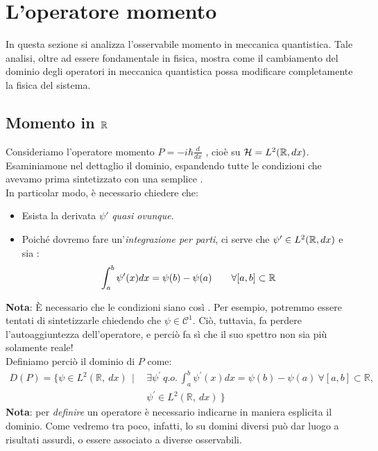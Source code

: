 \documentclass[../../FisicaTeorica.tex]{subfiles}
\begin{document}

\section{L'operatore momento}
In questa sezione si analizza l'osservabile momento in meccanica quantistica. Tale analisi, oltre ad essere fondamentale in fisica, mostra come il cambiamento del dominio degli operatori in meccanica quantistica possa modificare completamente la fisica del sistema.
\subsection{Momento in $\mathbb{R}$}
Consideriamo l'operatore momento $P=-i\hbar \frac{d}{dx}$ , cioè su $\mathcal{H} = L^2(\bm{\mathbb{R}}, dx)$. Esaminiamone nel dettaglio il dominio, espandendo tutte le condizioni che avevamo prima sintetizzato con una semplice .\\
In particolar modo, è necessario chiedere che:
\begin{itemize}
    \item Esista la derivata $\psi'$ \textit{quasi ovunque}.
    \item Poiché dovremo fare un'\textit{integrazione per parti}, ci serve che $\psi' \in L^2(\mathbb{R}, dx)$ e sia :
    \[
    \int_a^b \psi'(x)dx = \psi(b)-\psi(a) \qquad \forall [a,b] \subset \mathbb{R}
    \]
\end{itemize}
\textbf{Nota}: È necessario che le condizioni siano così . Per esempio, potremmo essere tentati di sintetizzarle chiedendo che $\psi \in \mathcal C^1$. Ciò, tuttavia, fa perdere l'autoaggiuntezza dell'operatore, e perciò fa sì che il suo spettro non sia più solamente reale!\\
Definiamo perciò il dominio di $P$ come:
\begin{align*}
D\left(P\right)= \big\{\psi\in L^2\left(\mathbb{R},\ dx\right)\ \ |\ \ 
&\exists\psi^\prime\ q.o.\, \int_{a}^{b}{\psi^\prime\left(x\right)dx}=\psi\left(b\right)-\psi\left(a\right)\ \forall\left[a,b\right]\subset\mathbb{R},\\
&\psi^\prime\in L^2(\mathbb{R},\ dx)\ \big\}
\end{align*}
\textbf{Nota}: per \textit{definire} un operatore è necessario indicarne in maniera esplicita il dominio. Come vedremo tra poco, infatti, lo  su domini diversi può dar luogo a risultati assurdi, o essere associato a diverse osservabili.\\
\end{document}
